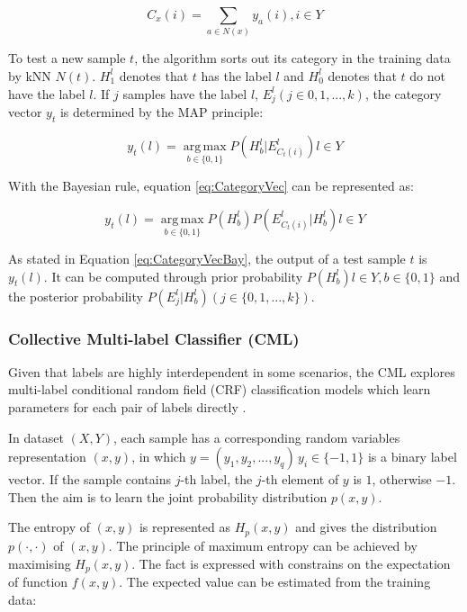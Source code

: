 \begin{equation}\label{eq:KNNCounting}
C_{x}(i) = \sum_{a \in N(x)} y_{a}(i), i \in Y
\end{equation}

To test a new sample $t$, the algorithm sorts out its category in the training data by kNN $N(t)$. $H_{1}^l$ denotes that $t$ has the label $l$ and $H_{0}^l$ denotes that $t$ do not have the label $l$. If $j$ samples have the label $l$, $E_{j}^l (j \in {0,1,...,k})$, the category vector $y_{t}$ is determined by the MAP principle:

\begin{equation}\label{eq:CategoryVec}
y_{t}(l) = \operatorname*{arg\,max}_{b \in \{0,1\}} P(H_{b}^l|E_{C_{t}(i) }^l) l \in Y
\end{equation}

With the Bayesian rule, equation \ref{eq:CategoryVec} can be represented as:

\begin{equation}\label{eq:CategoryVecBay}
y_{t}(l) = \operatorname*{arg\,max}_{b \in \{0,1\}} P(H_{b}^l)P(E_{C_{t}(i) }^l|H_{b}^l) l \in Y
\end{equation}

As stated in Equation \ref{eq:CategoryVecBay}, the output of a test sample $t$ is $y_{t}(l)$. It can be computed through prior probability $P(H_{b}^l) l \in Y, b \in \{0,1\}$ and the posterior probability $P(E_{j}^l|H_{b}^l) (j \in \{0,1,...,k\})$.

\subsubsection{Collective Multi-label Classifier (CML)}

Given that labels are highly interdependent in some scenarios, the CML explores multi-label conditional random field (CRF) classification models which learn  parameters for each pair of labels directly \citep{ghamrawi2005collective}.

In dataset $(X,Y)$, each sample has a corresponding random variables representation $(x,y)$, in which $y = (y_{1},y_{2},...,y_{q})\, y_{i} \in \{-1,1\}$ is a binary label vector. If the sample contains $j$-th label, the $j$-th element of $y$ is $1$, otherwise $-1$. Then the aim is to learn the joint probability distribution $p(x,y)$.

The entropy of $(x,y)$ is represented as $H_{p}(x,y)$ and gives the distribution $p(\cdot,\cdot)$ of $(x,y)$. The principle of maximum entropy can be achieved by maximising $H_{p}(x,y)$. The fact is expressed with constrains on the expectation of function $f(x,y)$. The expected value can be estimated from the training data:


